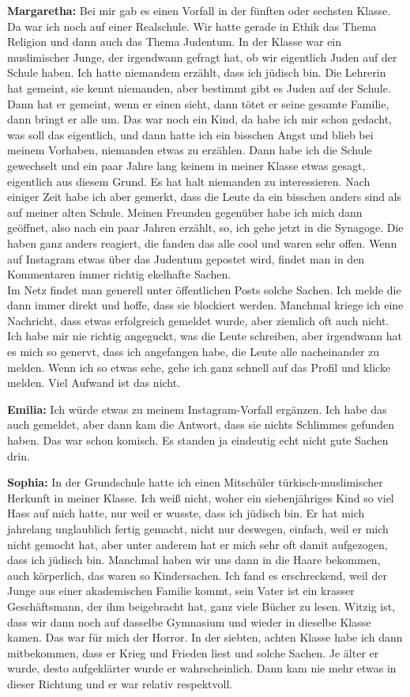 \textbf{Margaretha:} Bei mir gab es einen Vorfall in der fünften oder sechsten Klasse. Da war ich noch auf einer Realschule. Wir hatte gerade in Ethik das Thema Religion und dann auch das Thema Judentum. In der Klasse war ein muslimischer Junge, der irgendwann gefragt hat, ob wir eigentlich Juden auf der Schule haben. Ich hatte niemandem erzählt, dass ich jüdisch bin. Die Lehrerin hat gemeint, sie kennt niemanden, aber bestimmt gibt es Juden auf der Schule. Dann hat er gemeint, wenn er einen sieht, dann tötet er seine gesamte Familie, dann bringt er alle um. Das war noch ein Kind, da habe ich mir schon gedacht, was soll das eigentlich, und dann hatte ich ein bisschen Angst und blieb bei meinem Vorhaben, niemanden etwas zu erzählen. Dann habe ich die Schule gewechselt und ein paar Jahre lang keinem in meiner Klasse etwas gesagt, eigentlich aus diesem Grund. Es hat halt niemanden zu interessieren. Nach einiger Zeit habe ich aber gemerkt, dass die Leute da ein bisschen anders sind als auf meiner alten Schule. Meinen Freunden gegenüber habe ich mich dann geöffnet, also nach ein paar Jahren erzählt, so, ich gehe jetzt in die Synagoge. Die haben ganz anders reagiert, die fanden das alle cool und waren sehr offen. Wenn auf Instagram etwas über das Judentum gepostet wird, findet man in den Kommentaren immer richtig ekelhafte Sachen.\\ 
Im Netz findet man generell unter öffentlichen Posts solche Sachen. Ich melde die dann immer direkt und hoffe, dass sie blockiert werden. Manchmal kriege ich eine Nachricht, dass etwas erfolgreich gemeldet wurde, aber ziemlich oft auch nicht. Ich habe mir nie richtig angeguckt, was die Leute schreiben, aber irgendwann hat es mich so genervt, dass ich angefangen habe, die Leute alle nacheinander zu melden. Wenn ich so etwas sehe, gehe ich ganz schnell auf das Profil und klicke melden. Viel Aufwand ist das nicht.  

\textbf{Emilia:} Ich würde etwas zu meinem Instagram-Vorfall ergänzen. Ich habe das auch gemeldet, aber dann kam die Antwort, dass sie nichts Schlimmes gefunden haben. Das war schon komisch. Es standen ja eindeutig echt nicht gute Sachen drin.  

\textbf{Sophia:} In der Grundschule hatte ich einen Mitschüler türkisch-muslimischer Herkunft in meiner Klasse. Ich weiß nicht, woher ein siebenjähriges Kind so viel Hass auf mich hatte, nur weil er wusste, dass ich jüdisch bin. Er hat mich jahrelang unglaublich fertig gemacht, nicht nur deswegen, einfach, weil er mich nicht gemocht hat, aber unter anderem hat er mich sehr oft damit aufgezogen, dass ich jüdisch bin. Manchmal haben wir uns dann in die Haare bekommen, auch körperlich, das waren so Kindersachen. Ich fand es erschreckend, weil der Junge aus einer akademischen Familie kommt, sein Vater ist ein krasser Geschäftsmann, der ihm beigebracht hat, ganz viele Bücher zu lesen. Witzig ist, dass wir dann noch auf dasselbe Gymnasium und wieder in dieselbe Klasse kamen. Das war für mich der Horror. In der siebten, achten Klasse habe ich dann mitbekommen, dass er Krieg und Frieden liest und solche Sachen. Je älter er wurde, desto aufgeklärter wurde er wahrscheinlich. Dann kam nie mehr etwas in dieser Richtung und er war relativ respektvoll.  

